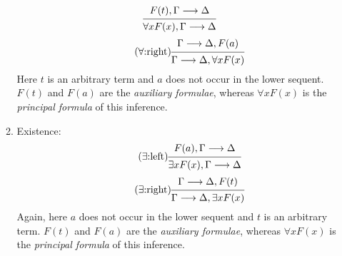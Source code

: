\documentclass[11pt,a4paper]{article}
\begin{document}
\begin{definition}
\begin{enumerate}
\begin{enumerate}
\begin{equation}
\begin{prooftree}
                        \hypo{F(t), \Gamma\seq\Delta}
                        \infer1{\forall x F(x), \Gamma\seq\Delta}
                    \end{prooftree}
                \end{equation}
                \begin{equation}
                    \tag{\(\forall\):right}
                    \label{eq:forall:right}
                    \begin{prooftree}
                        \hypo{\Gamma\seq\Delta, F(a)}
                        \infer1{\Gamma\seq\Delta, \forall xF(x)}
                    \end{prooftree}
                \end{equation}
                Here \(t\) is an arbitrary term and \(a\) does not occur in the lower sequent.
                \(F(t)\) and \(F(a)\) are the \emph{auxiliary formulae}, whereas \(\forall xF(x)\)
                is the \emph{principal formula} of this inference.
            \item\label{it:existence} Existence:
                \begin{equation}
                    \tag{\(\exists\):left}
                    \label{eq:exists:left}
                    \begin{prooftree}
                        \hypo{F(a), \Gamma\seq\Delta}
                        \infer1{\exists{}x F(x), \Gamma\seq\Delta}
                    \end{prooftree}
                \end{equation}
                \begin{equation}
                    \tag{\(\exists\):right}
                    \label{eq:exists:right}
                    \begin{prooftree}
                        \hypo{\Gamma\seq\Delta, F(t)}
                        \infer1{\Gamma\seq\Delta, \exists{}xF(x)}
                    \end{prooftree}
                \end{equation}
                Again, here \(a\) does not occur in the lower sequent and \(t\) is an arbitrary term.
                \(F(t)\) and \(F(a)\) are the \emph{auxiliary formulae}, whereas \(\forall xF(x)\)
                is the \emph{principal formula} of this inference.
        \end{enumerate}
\end{enumerate}
\end{definition}
\end{document}

